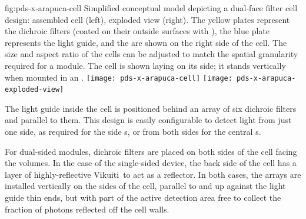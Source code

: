  \begin{dunefigure}{fig:pds-x-arapuca-cell}
{Simplified conceptual model depicting a %
dual-face filter   cell design: assembled cell (left),  exploded view (right). The yellow plates represent the dichroic filters (coated on their outside surfaces with ), the blue plate represents the light guide, and the  are shown on the right side of the cell. The size and aspect ratio of the cells can be adjusted to match the spatial granularity required for a  module. The cell is shown laying on its side; it stands vertically when mounted in an .} 
  \texttt{[image: pds-x-arapuca-cell]}
  \texttt{[image: pds-x-arapuca-exploded-view]}
\end{dunefigure}
The light guide inside the cell is positioned behind an array of six dichroic filters and parallel to them. 
This design is easily configurable to %
detect light from just one side, as required for the side s, or from both sides for the central s. 

For dual-sided  modules, dichroic filters are placed on both sides of the %
cell facing the \lar volumes.  In the case of the single-sided device, the back side of the cell  %
has a layer of highly-reflective Vikuiti\texttrademark\ to act as %
a  reflector.  In both cases, the  arrays are installed vertically on the sides of the cell, parallel to and up against the light guide thin ends, but with part of the active detection area free to collect the fraction of photons reflected off the cell walls. 

